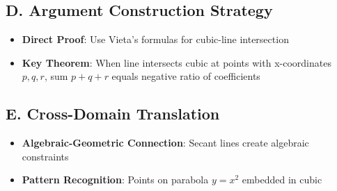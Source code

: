 \documentclass[]{article}
\begin{document}
\begin{strategicbox}
\subsection*{D. Argument Construction Strategy}
\begin{itemize}[leftmargin=*]
    \item \textbf{Direct Proof}: Use Vieta's formulas for cubic-line intersection
    \item \textbf{Key Theorem}: When line intersects cubic at points with x-coordinates $p, q, r$, sum $p+q+r$ equals negative ratio of coefficients
\end{itemize}

\subsection*{E. Cross-Domain Translation}
\begin{itemize}[leftmargin=*]
    \item \textbf{Algebraic-Geometric Connection}: Secant lines create algebraic constraints
    \item \textbf{Pattern Recognition}: Points on parabola $y = x^2$ embedded in cubic
\end{itemize}
\end{strategicbox}
\end{document}
